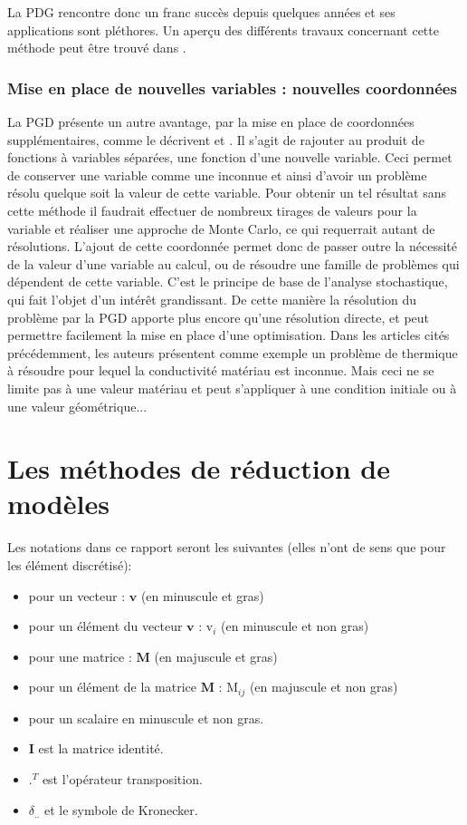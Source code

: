 \documentclass[12pt,a4paper]{report}
\begin{document}
La PDG rencontre donc un franc succès depuis quelques années et ses applications sont pléthores. Un aperçu des différents travaux concernant cette méthode peut être trouvé dans \cite{ShortReview}.

\subsection{Mise en place de nouvelles variables : nouvelles coordonnées}
La PGD présente un autre avantage, par la mise en place de coordonnées supplémentaires, comme le décrivent \cite{Paradigm} et \cite{DDAS}. Il s'agit de rajouter au produit de fonctions à variables séparées, une fonction d'une nouvelle variable. Ceci permet de conserver une variable comme une inconnue et ainsi d'avoir un problème résolu quelque soit la valeur de cette variable. Pour obtenir un tel résultat sans cette méthode il faudrait effectuer de nombreux tirages de valeurs pour la variable et réaliser une approche de Monte Carlo, ce qui requerrait autant de résolutions. L'ajout de cette coordonnée permet donc de passer outre la nécessité de la valeur d'une variable au calcul, ou de résoudre une famille de problèmes qui dépendent de cette variable. C'est le principe de base de l'analyse stochastique, qui fait l'objet d'un intérêt grandissant. De cette manière la résolution du problème par la PGD apporte plus encore qu'une résolution directe, et peut permettre facilement la mise en place d'une optimisation. Dans les articles cités précédemment, les auteurs présentent comme exemple un problème de thermique à résoudre pour lequel la conductivité matériau est inconnue. Mais ceci ne se limite pas à une valeur matériau et peut s'appliquer à une condition initiale ou à une valeur géométrique...

\chapter{Les méthodes de réduction de modèles}

Les notations dans ce rapport seront les suivantes (elles n'ont de sens que pour les élément discrétisé):
\begin{itemize}
\item pour un vecteur : $\mathbf{v}$ (en minuscule et gras)
\item pour un élément du vecteur $\mathbf{v}$ : $\text{v}_i$ 
								(en minuscule et non gras)
\item pour une matrice : $\mathbf{M}$ (en majuscule et gras)
\item pour un élément de la matrice $\mathbf{M}$ : $\text{M}_{ij}$ 
								(en majuscule et non gras)
\item pour un scalaire en minuscule et non gras.
\item $\mathbf{I}$ est la matrice identité.
\item $.^T$ est l'opérateur transposition.
\item $\delta_{..}$ et le symbole de Kronecker.
\end{itemize}
\end{document}
